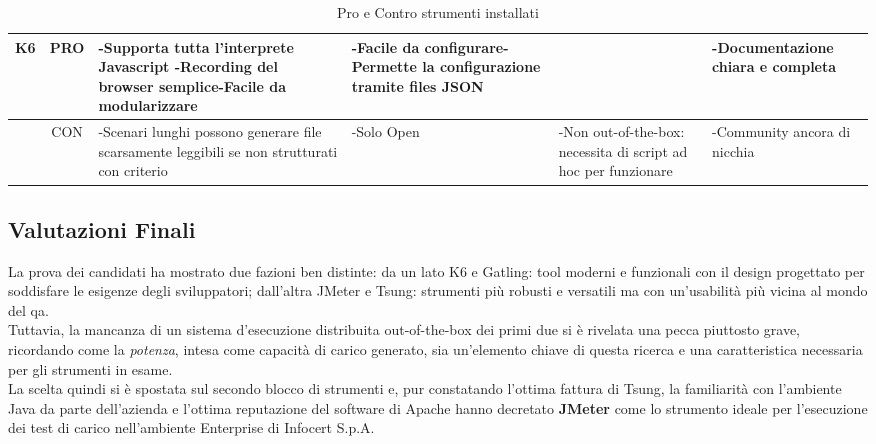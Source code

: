 \begin{table}[H]
\begin{center}
\begin{tabular}{|c|c|p{3cm}|p{3cm}|p{3cm}|p{3cm}|}
		\textbf{K6} & PRO & -Supporta tutta l'interprete Javascript \newline-Recording del browser semplice\newline-Facile da modularizzare & -Facile da configurare\newline-Permette la configurazione tramite files JSON &  & -Documentazione chiara e completa \\ \hline
		& CON & -Scenari lunghi possono generare file scarsamente leggibili se non strutturati con criterio & -Solo Open & -Non \gls{out-of-the-box}: necessita di script ad hoc per funzionare & -Community ancora di nicchia   \\ \hline\hline
	\end{tabular}
\end{center}
\caption{Pro e Contro strumenti installati}
\end{table}
\subsection{Valutazioni Finali}
La prova dei candidati ha mostrato due fazioni ben distinte: da un lato K6 e Gatling: tool moderni e funzionali con il design progettato per soddisfare le esigenze degli sviluppatori; dall'altra JMeter e Tsung: strumenti più robusti e versatili ma con un'usabilità più vicina al mondo del \gls{qa}. \\
Tuttavia, la mancanza di un sistema d'esecuzione distribuita \gls{out-of-the-box} dei primi due si è rivelata una pecca piuttosto grave, ricordando come la \textit{potenza}, intesa come capacità di carico generato, sia un'elemento chiave di questa ricerca e una caratteristica necessaria per gli strumenti in esame. \\
La scelta quindi si è spostata sul secondo blocco di strumenti e, pur constatando l'ottima fattura di Tsung, la familiarità con l'ambiente Java da parte dell'azienda e l'ottima reputazione del software di Apache hanno decretato \textbf{JMeter} come lo strumento ideale per l'esecuzione dei test di carico nell'ambiente Enterprise di Infocert S.p.A.